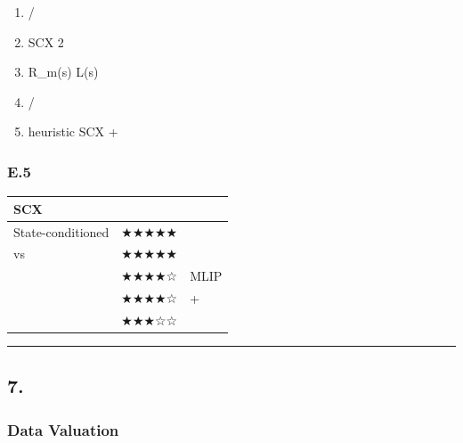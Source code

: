 \documentclass[
  12pt,
]{article}
\providecommand{\tightlist}{%
  \setlength{\itemsep}{0pt}\setlength{\parskip}{0pt}}
\begin{document}
\begin{enumerate}
\def\labelenumi{\arabic{enumi}.}
\tightlist
\item
  \textbf{}/
\item
  \textbf{}SCX  2
  
\item
  \textbf{} R\_m(s)
   L(s) 
\item
  \textbf{}/
\item
  \textbf{} heuristic SCX 
  + 
\end{enumerate}

\subsubsection{E.5
}\label{e.5-ux5deeux5f02ux5316ux6218ux7565ux603bux7ed3}

\begin{longtable}[]{@{}lll@{}}
\toprule\noalign{}
SCX  &  &  \\
\midrule\noalign{}
\endhead
\bottomrule\noalign{}
\endlastfoot
State-conditioned  & ★★★★★ &  \\
 vs  & ★★★★★ &  \\
 & ★★★★☆ &  MLIP  \\
 & ★★★★☆ &  +  \\
 & ★★★☆☆ &  \\
\end{longtable}

\begin{center}\rule{0.5\linewidth}{0.5pt}\end{center}

\subsection{7. }\label{ux53c2ux8003ux6587ux732e}

\subsubsection{Data Valuation}\label{data-valuation}
\end{document}
